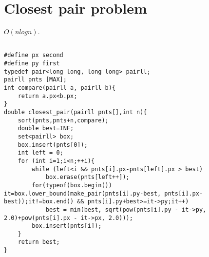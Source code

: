 \section{Closest pair problem}
$O(nlogn)$.
\begin{multicols}{2}
	\begin{lstlisting}

#define px second
#define py first
typedef pair<long long, long long> pairll;
pairll pnts [MAX];
int compare(pairll a, pairll b){ 
	return a.px<b.px; 
}
double closest_pair(pairll pnts[],int n){
	sort(pnts,pnts+n,compare);
	double best=INF;
	set<pairll> box;
	box.insert(pnts[0]);
	int left = 0;
	for (int i=1;i<n;++i){
		while (left<i && pnts[i].px-pnts[left].px > best)
			box.erase(pnts[left++]);
		for(typeof(box.begin()) it=box.lower_bound(make_pair(pnts[i].py-best, pnts[i].px-best));it!=box.end() && pnts[i].py+best>=it->py;it++)
			best = min(best, sqrt(pow(pnts[i].py - it->py, 2.0)+pow(pnts[i].px - it->px, 2.0)));
		box.insert(pnts[i]);
	}
	return best;
}

\end{lstlisting}
\end{multicols}

